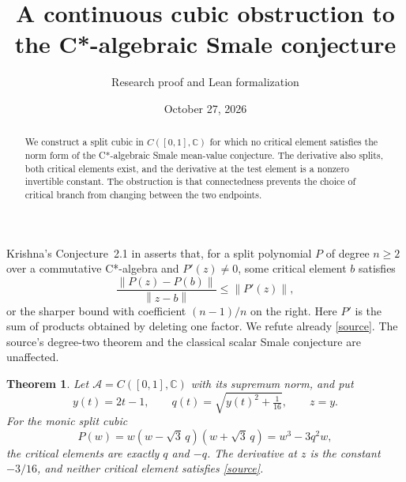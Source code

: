 \documentclass[11pt]{article}
\title{A continuous cubic obstruction to the C*-algebraic Smale conjecture}
\author{Research proof and Lean formalization}
\date{October 27, 2026}
\newtheorem{theorem}{Theorem}
\newcommand{\C}{\mathbb C}
\newcommand{\A}{\mathcal A}
\newcommand{\norm}[1]{\left\lVert#1\right\rVert}
\begin{document}
\maketitle
\begin{abstract}
We construct a split cubic in $C([0,1],\C)$ for which no critical element
satisfies the norm form of the C*-algebraic Smale mean-value conjecture.
The derivative also splits, both critical elements exist, and the derivative
at the test element is a nonzero invertible constant. The obstruction is that
connectedness prevents the choice of critical branch from changing between
the two endpoints.
\end{abstract}

Krishna's Conjecture~2.1 in \cite{Krishna} asserts that, for a split polynomial
$P$ of degree $n\geq2$ over a commutative C*-algebra and $P'(z)\ne0$,
some critical element $b$ satisfies
\begin{equation}\label{source}
 \frac{\norm{P(z)-P(b)}}{\norm{z-b}}\leq\norm{P'(z)},
\end{equation}
or the sharper bound with coefficient $(n-1)/n$ on the right.
Here $P'$ is the sum of products obtained by deleting one factor.
We refute already \eqref{source}. The source's degree-two theorem and the
classical scalar Smale conjecture are unaffected.

\begin{theorem}\label{main}
Let $\A=C([0,1],\C)$ with its supremum norm, and put
\[
 y(t)=2t-1,\qquad q(t)=\sqrt{y(t)^2+\tfrac1{16}},\qquad z=y.
\]
For the monic split cubic
\begin{equation}\label{cubic}
 P(w)=w(w-\sqrt3\,q)(w+\sqrt3\,q)=w^3-3q^2w,
\end{equation}
the critical elements are exactly $q$ and $-q$.
The derivative at $z$ is the constant $-3/16$, and neither critical element
satisfies \eqref{source}.
\end{theorem}
\end{document}
